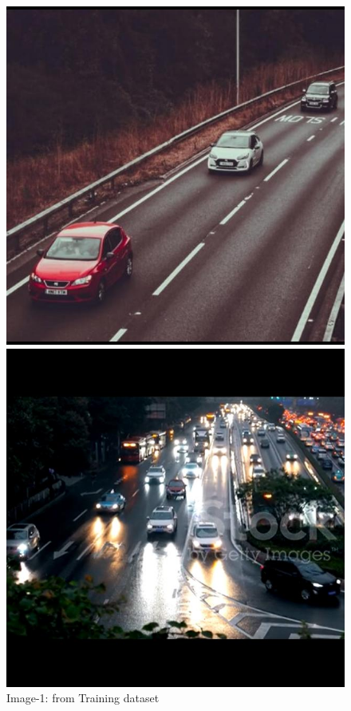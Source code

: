 \begin{figure}[H]
\begin{minipage}{0.5\textwidth}
    \includegraphics[width=\linewidth]{tex/img/train-2.jpg}
    \caption{Image-1: from Training dataset}
    \label{fig:train-2}
  \end{minipage}
  \begin{minipage}{0.5\textwidth}
    \centering
    \includegraphics[width=\linewidth]{tex/img/valid-1.jpg}

\end{minipage}
\end{figure}

